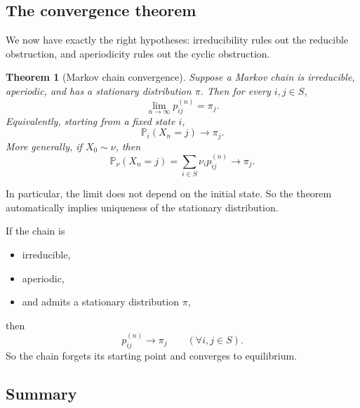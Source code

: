 \documentclass[11pt]{article}
\newtheorem{theorem}{Theorem}[section]
\theoremstyle{definition}
\begin{document}
\subsection{The convergence theorem}

We now have exactly the right hypotheses: irreducibility rules out the reducible obstruction, and aperiodicity rules out the cyclic obstruction.

\begin{theorem}[Markov chain convergence]
Suppose a Markov chain is irreducible, aperiodic, and has a stationary distribution \(\pi\). Then for every \(i,j\in S\),
\[
\lim_{n\to\infty} p_{ij}^{(n)}=\pi_j.
\]
Equivalently, starting from a fixed state \(i\),
\[
\mathbb P_i(X_n=j)\longrightarrow \pi_j.
\]
More generally, if \(X_0\sim \nu\), then
\[
\mathbb P_\nu(X_n=j)
=
\sum_{i\in S}\nu_i p_{ij}^{(n)}
\longrightarrow
\pi_j.
\]
\end{theorem}

In particular, the limit does not depend on the initial state. So the theorem automatically implies uniqueness of the stationary distribution.

\begin{keyformula}
If the chain is
\begin{itemize}[leftmargin=2em]
    \item irreducible,
    \item aperiodic,
    \item and admits a stationary distribution \(\pi\),
\end{itemize}
then
\[
p_{ij}^{(n)}\longrightarrow \pi_j
\qquad (\forall i,j\in S).
\]
So the chain forgets its starting point and converges to equilibrium.
\end{keyformula}

\subsection{Summary}
\end{document}
